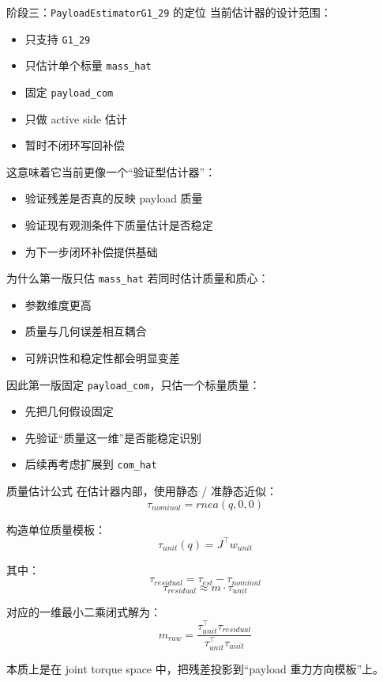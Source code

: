 \documentclass[aspectratio=169,11pt]{ctexbeamer}
\begin{document}
\begin{frame}{阶段三：\texttt{PayloadEstimatorG1\_29} 的定位}
  当前估计器的设计范围：
  \begin{itemize}
    \item 只支持 \texttt{G1\_29}
    \item 只估计单个标量 \texttt{mass\_hat}
    \item 固定 \texttt{payload\_com}
    \item 只做 active side 估计
    \item 暂时不闭环写回补偿
  \end{itemize}

  \vspace{0.4em}
  这意味着它当前更像一个“验证型估计器”：
  \begin{itemize}
    \item 验证残差是否真的反映 payload 质量
    \item 验证现有观测条件下质量估计是否稳定
    \item 为下一步闭环补偿提供基础
  \end{itemize}
\end{frame}

\begin{frame}{为什么第一版只估 \texttt{mass\_hat}}
  若同时估计质量和质心：
  \begin{itemize}
    \item 参数维度更高
    \item 质量与几何误差相互耦合
    \item 可辨识性和稳定性都会明显变差
  \end{itemize}

  \vspace{0.4em}
  因此第一版固定 \texttt{payload\_com}，只估一个标量质量：
  \begin{itemize}
    \item 先把几何假设固定
    \item 先验证“质量这一维”是否能稳定识别
    \item 后续再考虑扩展到 \texttt{com\_hat}
  \end{itemize}
\end{frame}

\begin{frame}{质量估计公式}
  在估计器内部，使用静态 / 准静态近似：
  \[
  \tau_{nominal}=rnea(q,0,0)
  \]

  构造单位质量模板：
  \[
  \tau_{unit}(q)=J^\top w_{unit}
  \]

  其中：
  \[
  \tau_{residual}=\tau_{est}-\tau_{nominal}
  \]
  \[
  \tau_{residual}\approx m\cdot \tau_{unit}
  \]

  对应的一维最小二乘闭式解为：
  \[
  m_{raw}=
  \frac{\tau_{unit}^{\top}\tau_{residual}}
  {\tau_{unit}^{\top}\tau_{unit}}
  \]

  本质上是在 joint torque space 中，把残差投影到“payload 重力方向模板”上。
\end{frame}
\end{document}
